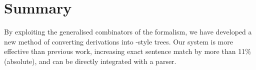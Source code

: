 \section{Summary}

By exploiting the generalised combinators of the \ccg formalism, we have developed a new method of converting \ccg derivations into \ptb-style trees.
Our system is more effective than previous work, increasing exact sentence match by more than 11\% (absolute), and can be directly integrated with a \ccg parser.






